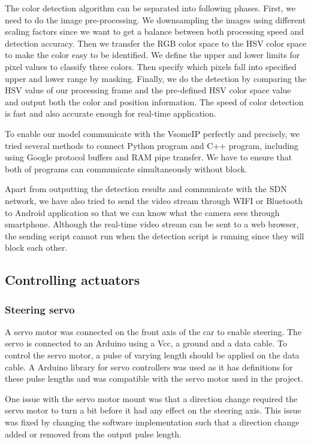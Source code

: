 \documentclass[11pt, titlepage]{article} %
\begin{document}
The color detection algorithm can be separated into following phases. First, we need to do the image pre-processing. We downsampling the images using different scaling factors since we want to get a balance between both processing speed and detection accuracy. Then we transfer the RGB color space to the HSV color space to make the color easy to be identified. We define the upper and lower limits for pixel values to classify three colors. Then specify which pixels fall into specified upper and lower range by masking. Finally, we do the detection by comparing the HSV value of our processing frame and the pre-defined HSV color space value and output both the color and position information. The speed of color detection is fast and also accurate enough for real-time application.

To enable our model communicate with the VsomeIP perfectly and precisely, we tried several methods to connect Python program and C++ program, including using Google protocol buffers and RAM pipe transfer. We have to ensure that both of programs can communicate simultaneously without block. 

Apart from outputting the detection results and communicate with the SDN network, we have also tried to send the video stream through WIFI or Bluetooth to Android application so that we can know what the camera sees through smartphone. Although the real-time video stream can be sent to a web browser, the sending script cannot run when the detection script is running since they will block each other.


\subsection{Controlling actuators}
\subsubsection{Steering servo}
A servo motor was connected on the front axis of the car to enable steering. The servo is connected to an Arduino using a Vcc, a ground and a data cable. To control the servo motor, a pulse of varying length should be applied on the data cable. A Arduino library for servo controllers was used as it has definitions for these pulse lengths and was compatible with the servo motor used in the project.

One issue with the servo motor mount was that a direction change required the servo motor to turn a bit before it had any effect on the steering axis. This issue was fixed by changing the software implementation such that a direction change added or removed from the output pulse length.
\end{document}
